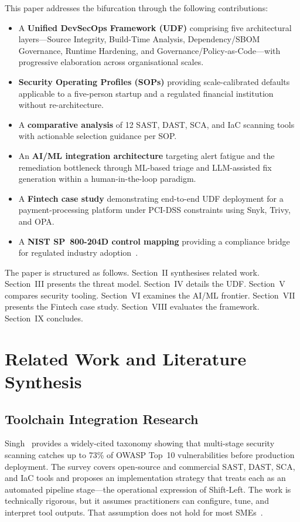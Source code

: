 \documentclass[letterpaper, 10pt, conference]{ieeeconf}
\begin{document}
This paper addresses the bifurcation through the following contributions:
\begin{itemize}
  \item A \textbf{Unified DevSecOps Framework (UDF)} comprising five
    architectural layers---Source Integrity, Build-Time Analysis,
    Dependency/SBOM Governance, Runtime Hardening, and
    Governance/Policy-as-Code---with progressive elaboration across
    organisational scales.
  \item \textbf{Security Operating Profiles (SOPs)} providing
    scale-calibrated defaults applicable to a five-person startup and a
    regulated financial institution without re-architecture.
  \item A \textbf{comparative analysis} of 12 SAST, DAST, SCA, and
    IaC scanning tools with actionable selection guidance per SOP.
  \item An \textbf{AI/ML integration architecture} targeting alert
    fatigue and the remediation bottleneck through ML-based triage and
    LLM-assisted fix generation within a human-in-the-loop paradigm.
  \item A \textbf{Fintech case study} demonstrating end-to-end UDF
    deployment for a payment-processing platform under PCI-DSS
    constraints using Snyk, Trivy, and OPA.
  \item A \textbf{NIST SP~800-204D control mapping} providing a
    compliance bridge for regulated industry adoption~\cite{nist2024}.
\end{itemize}

The paper is structured as follows. Section~II synthesises related
work. Section~III presents the threat model. Section~IV details the
UDF. Section~V compares security tooling. Section~VI examines the AI/ML
frontier. Section~VII presents the Fintech case study. Section~VIII
evaluates the framework. Section~IX concludes.

\section{Related Work and Literature Synthesis}

\subsection{Toolchain Integration Research}

Singh~\cite{singh2020} provides a widely-cited taxonomy showing that
multi-stage security scanning catches up to 73\% of OWASP Top~10
vulnerabilities before production deployment. The survey covers
open-source and commercial SAST, DAST, SCA, and IaC tools and proposes
an implementation strategy that treats each as an automated pipeline
stage---the operational expression of Shift-Left. The work is technically
rigorous, but it assumes practitioners can configure, tune, and interpret
tool outputs. That assumption does not hold for most
SMEs~\cite{cheenepalli2025}.
\end{document}
